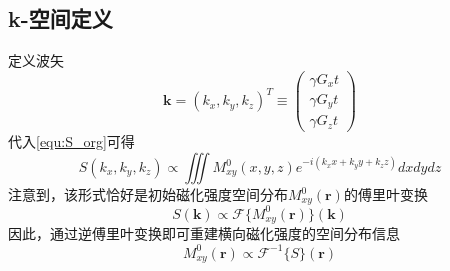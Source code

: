 \documentclass[12pt]{article}
\begin{document}
\subsection{k-空间定义}
定义波矢
\begin{equation}
    \bm{k}=(k_x,k_y,k_z)^T\equiv\begin{pmatrix} \gamma G_xt \\ \gamma G_yt \\ \gamma G_zt \end{pmatrix}
\end{equation}
代入\autoref{equ:S_org}可得
\begin{equation}
    \boxed{S(k_x,k_y,k_z)\propto\iiint M_{xy}^0(x,y,z)e^{-i(k_xx+k_yy+k_z z)} dxdydz}
\end{equation}
注意到，该形式恰好是初始磁化强度空间分布$M_{xy}^0(\bm{r})$的傅里叶变换
\begin{equation}
    \boxed{S(\bm{k})\propto\mathcal{F}\{M_{xy}^0(\bm{r})\}(\bm{k})}
\end{equation}
因此，通过逆傅里叶变换即可重建横向磁化强度的空间分布信息
\begin{equation}
    M_{xy}^0(\bm{r})\propto\mathcal{F}^{-1}\{S\}(\bm{r})
\end{equation}

\newpage
\appendix
\end{document}
